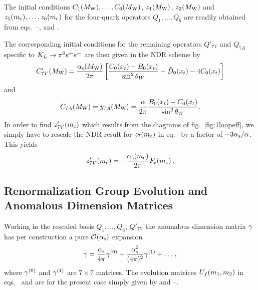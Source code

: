 The initial conditions $C_1(M_{\rm W}),\ldots,C_6(M_{\rm W})$, $z_1(M_{\rm W})$, $z_2(M_{\rm W})$
and $z_1(m_{\rm c}),\ldots,z_6(m_{\rm c})$ for the four-quark operators $Q_1,\ldots,Q_6$
are readily obtained from eqs.~--,
 and .

The corresponding initial conditions for the remaining operators
$Q'_{7V}$ and $Q_{7A}$ specific to $K_L \to \pi^0 e^+ e^-$ are then given in the NDR
scheme by
\begin{equation}
C'_{7V}(M_{\rm W}) = \frac{\alpha_{\rm s}(M_{\rm W})}{2 \pi}
\left[ \frac{C_0(x_t)-B_0(x_t)}{\sin^2\theta_W} -\tilde{D}_0(x_t) -
4 C_0(x_t) \right]
\label{eq:C7VprimeMw}
\end{equation}
and
\begin{equation}
C_{7A}(M_{\rm W}) = 
y_{7A}(M_{\rm W}) = \frac{\alpha}{2 \pi} \frac{B_0(x_t)-C_0(x_t)}{\sin^2\theta_W}.
\label{eq:C7AMw}
\end{equation}
In order to find $z'_{7V}(m_{\rm c})$ which results from the diagrams of
fig.\ \ref{fig:1loopeff}, we simply have to rescale the NDR result for
$z_7(m_{\rm c})$ in eq.~ by a factor of $-3 \alpha_{\rm s}/\alpha$. This
yields
\begin{equation}
z'_{7V}(m_{\rm c}) = -\frac{\alpha_{\rm s}(m_{\rm c})}{2 \pi} F_{\rm e}(m_{\rm c}) \, .
\label{eq:z7primemc}
\end{equation}

\subsection{Renormalization Group Evolution and Anomalous Dimension Matrices}
            \label{sec:HeffKpe:rge}
Working in the rescaled basis $Q_1,\ldots,Q_6$, $Q'_{7V}$ the anomalous
dimension matrix $\gamma$ has per construction a pure ${\cal O}(\alpha_{\rm s})$ expansion
\begin{equation}
\gamma = \frac{\alpha_{\rm s}}{4\pi}       \gamma^{(0)} +
      \frac{\alpha_{\rm s}^2}{(4\pi)^2} \gamma^{(1)} + \ldots
\, ,
\label{eq:gsexpKpe}
\end{equation}
where $\gamma^{(0)}$ and $\gamma^{(1)}$ are $7 \times 7$ matrices. The
evolution matrices $U_{f}(m_1,m_2)$ in eqs.~ and
 are for the present case simply given by 
and --.

